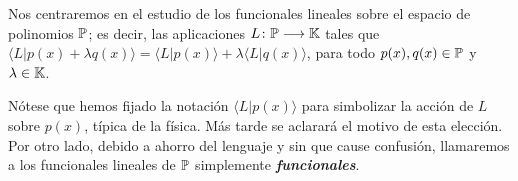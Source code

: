 Nos centraremos en el estudio de los funcionales lineales sobre el espacio de polinomios $\mathbb{P}$; es decir, las aplicaciones $L \colon \mathbb{P} \longrightarrow \mathbb{K}$ tales que $\langle L | p(x) + \lambda q(x) \rangle = \langle L | p(x) \rangle + \lambda \langle L | q(x) \rangle$, para todo $p(x), q(x) \in \mathbb{P}$ y $\lambda \in \mathbb{K}$. 

\begin{obs}
Nótese que hemos fijado la notación $\langle L | p(x) \rangle$ para simbolizar la acción de $L$ sobre $p(x)$, típica de la física. Más tarde se aclarará el motivo de esta elección. Por otro lado, debido a ahorro del lenguaje y sin que cause confusión, llamaremos a los funcionales lineales de $\mathbb{P}$ simplemente \textit{\textbf{funcionales}}.
\end{obs}

